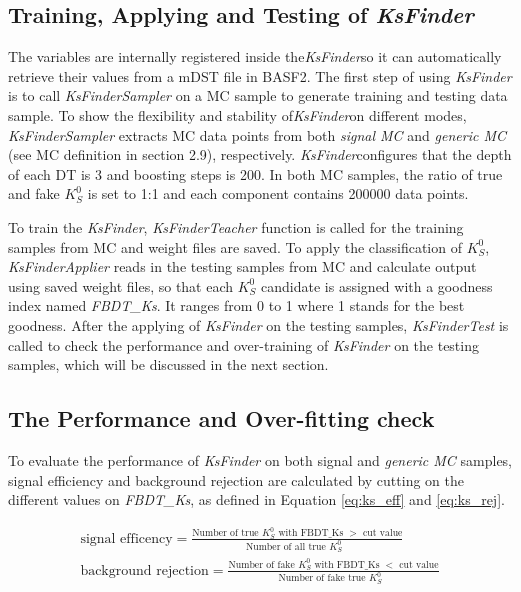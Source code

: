 \subsection{Training, Applying and Testing of \textit{KsFinder}}
The variables are internally registered inside the\textit{KsFinder}so it can automatically retrieve their values from a mDST file in BASF2. The first step of using \textit{KsFinder} is to call \textit{KsFinderSampler} on a MC sample to generate training and testing data sample. To show the flexibility and stability of\textit{KsFinder}on different modes, \textit{KsFinderSampler} extracts MC data points from both \textit{signal MC} and \textit{generic MC} (see MC definition in section 2.9), respectively. \textit{KsFinder}configures that the depth of each DT is 3 and boosting steps is 200. In both MC samples, the ratio of true and fake $K_S^0$ is set to 1:1 and each component contains 200000 data points.

To train the \textit{KsFinder}, \textit{KsFinderTeacher} function is called for the training samples from MC and weight files are saved. To apply the classification of $K_S^0$, \textit{KsFinderApplier} reads in the testing samples from MC and calculate output using saved weight files, so that each $K_S^0$ candidate is assigned with a goodness index named \textit{FBDT\_Ks}. It ranges from 0 to 1 where 1 stands for the best goodness. After the applying of \textit{KsFinder} on the testing samples, \textit{KsFinderTest} is called to check the performance and over-training of \textit{KsFinder} on the testing samples, which will be discussed in the next section. 

\subsection{The Performance and Over-fitting check}
To evaluate the performance of \textit{KsFinder} on both signal and \textit{generic MC} samples, signal efficiency and background rejection are calculated by cutting on the different values on \textit{FBDT\_Ks}, as defined in Equation \ref{eq:ks_eff} and \ref{eq:ks_rej}.

\begin{eqnarray}
	\text{signal efficency} = \frac{\text{Number of true $K_S^0$ with FBDT\_Ks $>$ cut value}}{\text{Number of all true $K_S^0$ }} \label{eq:ks_eff}\\
	\text{background rejection} = \frac{\text{Number of fake $K_S^0$ with FBDT\_Ks $<$ cut value}}{\text{Number of fake true $K_S^0$ }} \label{eq:ks_rej}
\end{eqnarray}

